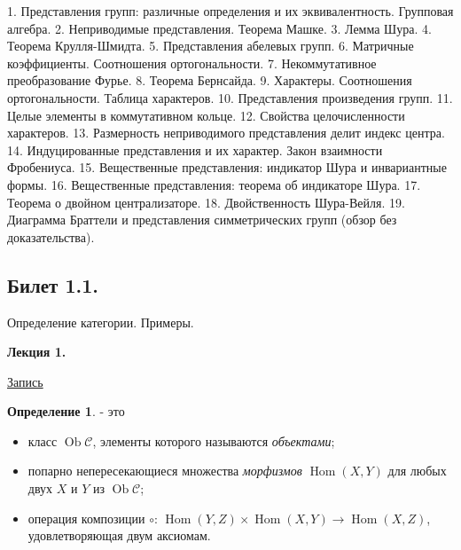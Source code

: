 \documentclass[a4paper]{article}
\newcommand{\mybox}{%
    \collectbox{%
        \setlength{\fboxsep}{1pt}%
        \fbox{\BOXCONTENT}%
    }%
}
\theoremstyle{indented}
\theoremstyle{definition}
\newtheorem{defn}{Определение}
\theoremstyle{remark}
\DeclareMathOperator{\Hom}{Hom}
\DeclareMathOperator{\Ob}{Ob}
\begin{document}
1. Представления групп: различные определения и их эквивалентность. Групповая алгебра. 
2. Неприводимые представления. Теорема Машке. 
3. Лемма Шура. 
4. Теорема Крулля-Шмидта. 
5. Представления абелевых групп. 
6. Матричные коэффициенты. Соотношения ортогональности. 
7. Некоммутативное преобразование Фурье. 
8. Теорема Бернсайда. 
9. Характеры. Соотношения ортогональности. Таблица характеров. 
10. Представления произведения групп. 
11. Целые элементы в коммутативном кольце. 
12. Свойства целочисленности характеров. 
13. Размерность неприводимого представления делит индекс центра. 
14. Индуцированные представления и их характер. Закон взаимности Фробениуса. 
15. Вещественные представления: индикатор Шура и инвариантные формы. 
16. Вещественные представления: теорема об индикаторе Шура. 
17. Теорема о двойном централизаторе. 
18. Двойственность Шура-Вейля. 
19. Диаграмма Браттели и представления симметрических групп (обзор без доказательства).

\newpage

\subsection{Билет 1.1.}

Определение категории. Примеры. 

\hrulefill

\textbf{Лекция 1.} 

\begin{flushright}
    \mybox{
        \href{https://disk.yandex.ru/d/knoQ44wLmGDwwQ/2021-2022%20учебный%20год%20(осенний%20семестр)/2%20курс/Теоретическая%20информатика/Теор%20информатика%2C%20лекция%2C%2001.09.2021.mp4}{Запись}
    }
\end{flushright}

\begin{defn} 
     - это 

        \begin{itemize}
            \item класс $\Ob\mathcal{C}$, элементы которого называются \textit{объектами};
            \item попарно непересекающиеся множества \textit{морфизмов} $\Hom (X, Y)$ для любых двух $X$ и $Y$ из $\Ob\mathcal{C}$;
            \item операция композиции $\circ $: $\Hom (Y, Z)\times \Hom (X, Y) \rightarrow \Hom (X, Z)$, удовлетворяющая двум аксиомам.
        \end{itemize}
\end{defn}
\end{document}
